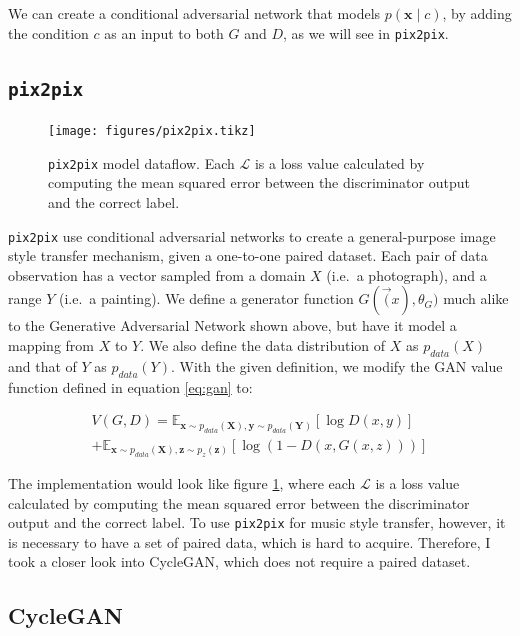 \documentclass[12pt,a4paper,]{report}
\begin{document}
We can create a conditional adversarial network that models
\(p(\mathbf{x} \mid c)\), by adding the condition \(c\) as an input to
both \(G\) and \(D\), as we will see in \texttt{pix2pix}.

\hypertarget{pix2pix}{%
\subsection{\texorpdfstring{\texttt{pix2pix}}{pix2pix}}\label{pix2pix}}

\begin{figure}[h]
    \texttt{[image: figures/pix2pix.tikz]}
\centering
\caption{\texttt{pix2pix} model dataflow. Each $\mathcal{L}$ is a loss value calculated by computing the mean squared error between the discriminator output and the correct label. \label{fig:pix2pix}}
\end{figure}

\texttt{pix2pix} use conditional adversarial networks to create a
general-purpose image style transfer mechanism, given a one-to-one
paired dataset. Each pair of data observation has a vector sampled from
a domain \(X\) (i.e.~a photograph), and a range \(Y\) (i.e.~a painting).
We define a generator function \(G(\vec(x), \theta_G)\) much alike to
the Generative Adversarial Network shown above, but have it model a
mapping from \(X\) to \(Y\). We also define the data distribution of
\(X\) as \(p_{data}(X)\) and that of \(Y\) as \(p_{data}(Y)\). With the
given definition, we modify the GAN value function defined in equation
\ref{eq:gan} to:

\begin{multline}
    V(G, D) = \mathbb{E}_{\mathbf{x} \sim p_{data}(\mathbf{X}), \mathbf{y} \sim p_{data}(\mathbf{Y})}[\log D(x, y)] \\ +  \mathbb{E}_{\mathbf{x} \sim p_{data}(\mathbf{X}), \mathbf{z} \sim p_{z}(\mathbf{z})}[\log (1 - D(x, G(x, z)))] \label{eq:pix2pix}
\end{multline}

The implementation would look like figure \ref{fig:pix2pix}, where each
\(\mathcal{L}\) is a loss value calculated by computing the mean squared
error between the discriminator output and the correct label. To use
\texttt{pix2pix} for music style transfer, however, it is necessary to
have a set of paired data, which is hard to acquire. Therefore, I took a
closer look into CycleGAN, which does not require a paired dataset.

\hypertarget{cyclegan}{%
\subsection{CycleGAN}\label{cyclegan}}
\end{document}
